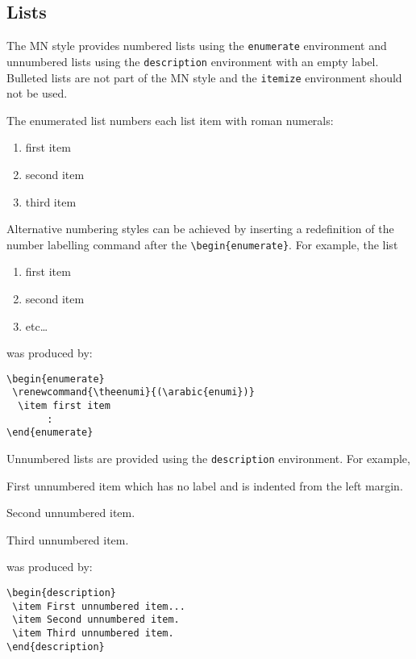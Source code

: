 \subsection{Lists}

The MN style provides numbered lists using the \verb"enumerate"
environment and unnumbered lists using the \verb"description"
environment with an empty label. Bulleted lists are not part of the MN
style and the \verb"itemize" environment should not be used.

The enumerated list numbers each list item with roman numerals:
%
\begin{enumerate}
  \item first item
  \item second item
  \item third item
\end{enumerate}
%
Alternative numbering styles can be achieved by inserting a
redefinition of the number labelling command after the
\verb"\begin{enumerate}". For example, the list
%
\begin{enumerate}
\renewcommand{\theenumi}{(\arabic{enumi})}
  \item first item
  \item second item
  \item etc\ldots
\end{enumerate}
%
was produced by:
%
\begin{verbatim}
\begin{enumerate}
 \renewcommand{\theenumi}{(\arabic{enumi})}
  \item first item
       :
\end{enumerate}
\end{verbatim}
%
Unnumbered lists are provided using the \verb"description" environment.
For example,
\begin{description}
  \item First unnumbered item which has no label and is indented from
        the left margin.
  \item Second unnumbered item.
  \item Third unnumbered item.
\end{description}
was produced by:
%
\begin{verbatim}
\begin{description}
 \item First unnumbered item...
 \item Second unnumbered item.
 \item Third unnumbered item.
\end{description}
\end{verbatim}

